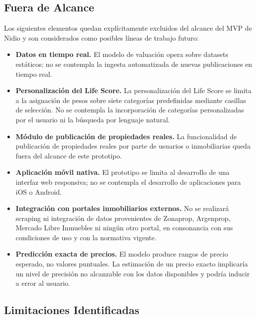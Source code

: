 \subsection{Fuera de Alcance}

Los siguientes elementos quedan explícitamente excluidos del alcance del MVP de Nidio y son considerados como posibles líneas de trabajo futuro:

\begin{itemize}
\item \textbf{Datos en tiempo real.} El modelo de valuación opera sobre datasets estáticos; no se contempla la ingesta automatizada de nuevas publicaciones en tiempo real.
\item \textbf{Personalización del Life Score.} La personalización del Life Score se limita a la asignación de pesos sobre siete categorías predefinidas mediante casillas de selección. No se contempla la incorporación de categorías personalizadas por el usuario ni la búsqueda por lenguaje natural.
\item \textbf{Módulo de publicación de propiedades reales.} La funcionalidad de publicación de propiedades reales por parte de usuarios o inmobiliarias queda fuera del alcance de este prototipo.
\item \textbf{Aplicación móvil nativa.} El prototipo se limita al desarrollo de una interfaz web responsiva; no se contempla el desarrollo de aplicaciones para iOS o Android.
\item \textbf{Integración con portales inmobiliarios externos.} No se realizará scraping ni integración de datos provenientes de Zonaprop, Argenprop, Mercado Libre Inmuebles ni ningún otro portal, en consonancia con sus condiciones de uso y con la normativa vigente.
\item \textbf{Predicción exacta de precios.} El modelo produce rangos de precio esperado, no valores puntuales. La estimación de un precio exacto implicaría un nivel de precisión no alcanzable con los datos disponibles y podría inducir a error al usuario.
\end{itemize}

\subsection{Limitaciones Identificadas}

